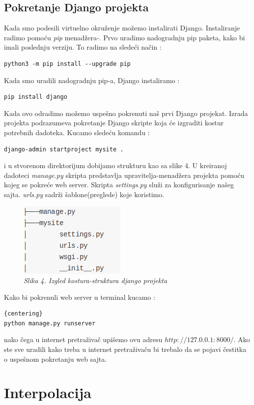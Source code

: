 \documentclass[12pt]{article}
\begin{document}
\subsection{Pokretanje Django projekta}
Kada smo podesili virtuelno okruženje možemo instalirati Django.  Instaliranje radimo pomoću  \textsl{pip} menadžera-. Prvo uradimo nadogradnju pip paketa, kako bi imali poslednju verziju. To radimo na sledeći način :
\begin{lstlisting}
python3 -m pip install --upgrade pip
\end{lstlisting} 
Kada smo uradili nadogradnju pip-a, Django instaliramo :
\begin{lstlisting}
pip install django
\end{lstlisting}
Kada ovo odradimo možemo uspešno pokrenuti naš prvi Django projekat. Izrada projekta podrazumeva pokretanje Django skripte koja će izgraditi kostur potrebnih dadoteka. Kucamo sledeću komandu :
\begin{lstlisting}
django-admin startproject mysite .
\end{lstlisting} 
i u stvorenom direktorijum dobijamo strukturu kao sa slike 4.  U kreiranoj dadoteci \textsl{manage.py} skripta predstavlja upravitelja-menadžera projekta pomoću kojeg se pokreće web server. Skripta        \textsl{settings.py} služi za konfigurisanje našeg sajta. \textsl{urls.py} sadrži šablone(preglede) koje koristimo.
\begin{figure}[h!]
\centering
\includegraphics[width=0.4\linewidth]{kostur.png}
\caption*{\textsl{Slika 4. Izgled kostura-struktura django projekta}}
\end{figure}
Kako bi pokrenuli web server u terminal kucamo : 
\begin{lstlisting}{centering}
python manage.py runserver
\end{lstlisting}nako čega u internet pretraživač upišemo ovu adresu $http://127.0.0.1:8000/$.  Ako ste sve uradili kako treba u internet pretraživaču bi trebalo da se pojavi čestitka o uspešnom pokretanju web sajta.

\newpage
\section{Interpolacija}
\end{document}
